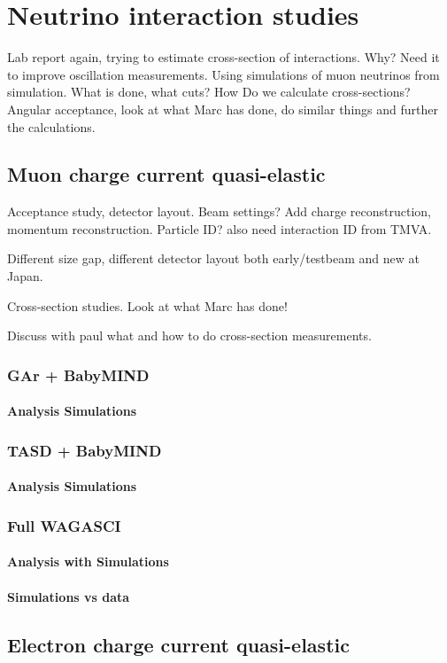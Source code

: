 \chapter{Neutrino interaction studies}
\label{c:neutrino}

Lab report again, trying to estimate cross-section of interactions. Why? Need it to improve oscillation measurements. Using simulations of muon neutrinos from simulation. What is done, what cuts? How Do we calculate cross-sections? Angular acceptance, look at what Marc has done, do similar things and further the calculations.


\section{Muon charge current quasi-elastic}

Acceptance study, detector layout. Beam settings? Add charge reconstruction, momentum reconstruction. Particle ID? also need interaction ID from TMVA.

Different size gap, different detector layout both early/testbeam and new at Japan.


Cross-section studies. Look at what Marc has done! 

Discuss with paul what and how to do cross-section measurements.

\subsection{GAr + BabyMIND}
\subsubsection{Analysis Simulations}
\subsection{TASD + BabyMIND}
\subsubsection{Analysis Simulations}
\subsection{Full WAGASCI}
\subsubsection{Analysis with Simulations}
\subsubsection{Simulations vs data}

\section{Electron charge current quasi-elastic}